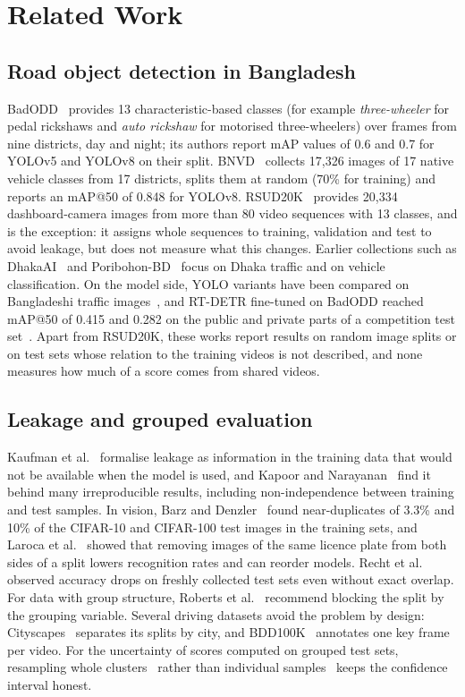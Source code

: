 \documentclass[conference]{IEEEtran}
\begin{document}
\section{Related Work}

\subsection{Road object detection in Bangladesh}
BadODD~\cite{badodd} provides 13 characteristic-based classes (for example \emph{three-wheeler} for pedal
rickshaws and \emph{auto rickshaw} for motorised three-wheelers) over frames from nine districts, day and
night; its authors report mAP values of 0.6 and 0.7 for YOLOv5 and YOLOv8 on their split. BNVD~\cite{bnvd}
collects 17,326 images of 17 native vehicle classes from 17 districts, splits them at random (70\% for
training) and reports an mAP@50 of 0.848 for YOLOv8. RSUD20K~\cite{rsud20k} provides 20,334
dashboard-camera images from more than 80 video sequences with 13 classes, and is the exception: it assigns
whole sequences to training, validation and test to avoid leakage, but does not measure what this changes.
Earlier collections such as DhakaAI~\cite{dhakaai} and Poribohon-BD~\cite{poribohon} focus on Dhaka traffic
and on vehicle classification. On the model side, YOLO variants have been compared on Bangladeshi traffic
images~\cite{alamgir,yoloeval}, and RT-DETR fine-tuned on BadODD reached mAP@50 of 0.415 and 0.282 on the
public and private parts of a competition test set~\cite{rtdetrbd}. Apart from RSUD20K, these works report
results on random image splits or on test sets whose relation to the training videos is not described, and
none measures how much of a score comes from shared videos.

\subsection{Leakage and grouped evaluation}
Kaufman et al.~\cite{kaufman} formalise leakage as information in the training data that would not be
available when the model is used, and Kapoor and Narayanan~\cite{kapoor} find it behind many irreproducible
results, including non-independence between training and test samples. In vision, Barz and
Denzler~\cite{barz} found near-duplicates of 3.3\% and 10\% of the CIFAR-10 and CIFAR-100 test images in the
training sets, and Laroca et al.~\cite{laroca} showed that removing images of the same licence plate from
both sides of a split lowers recognition rates and can reorder models. Recht et al.~\cite{recht} observed
accuracy drops on freshly collected test sets even without exact overlap. For data with group structure,
Roberts et al.~\cite{roberts} recommend blocking the split by the grouping variable. Several driving
datasets avoid the problem by design: Cityscapes~\cite{cityscapes} separates its splits by city, and
BDD100K~\cite{bdd100k} annotates one key frame per video. For the uncertainty of scores computed on grouped
test sets, resampling whole clusters~\cite{fieldwelsh} rather than individual samples~\cite{efron} keeps
the confidence interval honest.
\end{document}

